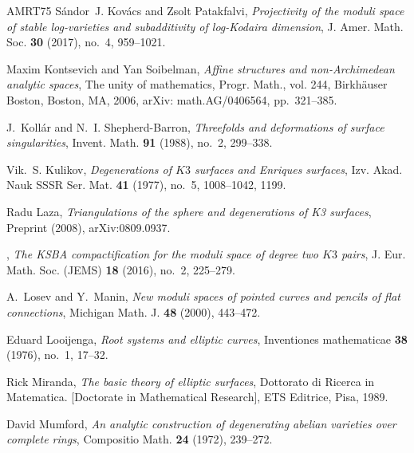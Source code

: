 \documentclass[table,x11names]{amsart}
\begin{document}
\begin{thebibliography}{AMRT75}
S\'{a}ndor~J. Kov\'{a}cs and Zsolt Patakfalvi, \emph{Projectivity of the moduli
  space of stable log-varieties and subadditivity of log-{K}odaira dimension},
  J. Amer. Math. Soc. \textbf{30} (2017), no.~4, 959--1021. 

Maxim Kontsevich and Yan Soibelman, \emph{{A}ffine structures and
  non-{A}rchimedean analytic spaces}, The unity of mathematics, Progr. Math.,
  vol. 244, Birkh\"auser Boston, Boston, MA, 2006, arXiv: math.AG/0406564,
  pp.~321--385. 

J.~Koll{\'a}r and N.~I. Shepherd-Barron, \emph{{T}hreefolds and deformations of
  surface singularities}, Invent. Math. \textbf{91} (1988), no.~2, 299--338.

Vik.~S. Kulikov, \emph{Degenerations of {$K3$} surfaces and {E}nriques
  surfaces}, Izv. Akad. Nauk SSSR Ser. Mat. \textbf{41} (1977), no.~5,
  1008--1042, 1199. 

Radu Laza, \emph{Triangulations of the sphere and degenerations of {K3}
  surfaces}, Preprint (2008), arXiv:0809.0937.

\bysame, \emph{The {KSBA} compactification for the moduli space of degree two
  {$K3$} pairs}, J. Eur. Math. Soc. (JEMS) \textbf{18} (2016), no.~2, 225--279.

A.~Losev and Y.~Manin, \emph{{N}ew moduli spaces of pointed curves and pencils
  of flat connections}, Michigan Math. J. \textbf{48} (2000), 443--472.

Eduard Looijenga, \emph{Root systems and elliptic curves}, Inventiones
  mathematicae \textbf{38} (1976), no.~1, 17--32.

Rick Miranda, \emph{The basic theory of elliptic surfaces}, Dottorato di
  Ricerca in Matematica. [Doctorate in Mathematical Research], ETS Editrice,
  Pisa, 1989. 

David Mumford, \emph{{A}n analytic construction of degenerating abelian
  varieties over complete rings}, Compositio Math. \textbf{24} (1972),
  239--272. 


\end{thebibliography}
\end{document}
